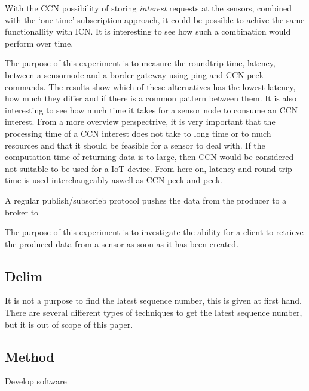 With the CCN possibility of storing \textit{interest} requests at the sensors, combined with the `one-time' subscription approach, it could be possible to achive the same functionallity with ICN. It is interesting to see how such a combination would perform over time. 



The purpose of this experiment is to measure the roundtrip time, latency, between a sensornode and a border gateway using ping and CCN peek commands. The results show which of these alternatives has the lowest latency, how much they differ and if there is a common pattern between them. It is also interesting to see how much time it takes for a sensor node to consume an CCN interest. From a more overview perspectrive, it is very important that the processing time of a CCN interest does not take to long time or to much resources and that it should be feasible for a sensor to deal with. If the computation time of returning data is to large, then CCN would be considered not suitable to be used for a IoT device. From here on, latency and round trip time is used interchangeably aswell as CCN peek and peek.

A regular publish/subscrieb protocol pushes the data from the producer to a broker to 


The purpose of this experiment is to investigate the ability for a client to retrieve the produced data from a sensor as soon as it has been created. 


\subsection{Delim}
It is not a purpose to find the latest sequence number, this is given at first hand. There are several different types of techniques to get the latest sequence number, but it is out of scope of this paper. 


\subsection{Method}
Develop software

